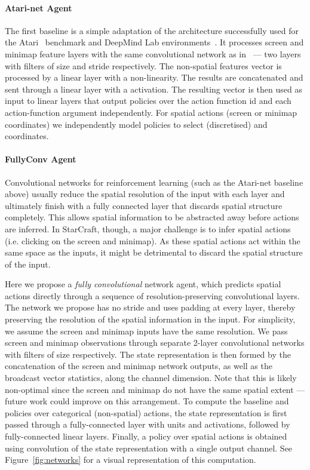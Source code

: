 \documentclass{article}
\begin{document}
\paragraph{Atari-net Agent}
The first baseline is a simple adaptation of the architecture successfully used for the Atari~\cite{bellemare2013arcade} benchmark and DeepMind Lab environments~\cite{Beattie:2016}. 
It processes screen and minimap feature layers with the same convolutional network as in~\cite{mnih2016asynchronous} --- two layers with  filters of size  and stride  respectively. 
The non-spatial features vector is processed by a linear layer with a  non-linearity. 
The results are concatenated and sent through a linear layer with a  activation. 
The resulting vector is then used as input to linear layers that output policies over the action function id  and each action-function argument  independently.
For spatial actions (screen or minimap coordinates) we independently model policies to select (discretised)  and  coordinates.

\paragraph{FullyConv Agent} 
Convolutional networks for reinforcement learning (such as the Atari-net baseline above) usually reduce the spatial resolution of the input with each layer and ultimately finish with a fully connected layer that discards spatial structure completely. 
This allows spatial information to be abstracted away before actions are inferred. In StarCraft, though, a major challenge is to infer spatial actions (i.e. clicking on the screen and minimap). 
As these spatial actions act within the same space as the inputs, it might be detrimental to discard the spatial structure of the input.

Here we propose a \textit{fully convolutional} network agent, which predicts spatial actions directly through a sequence of resolution-preserving convolutional layers.
The network we propose has no stride and uses padding at every layer, thereby preserving the resolution of the spatial information in the input. 
For simplicity, we assume the screen and minimap inputs have the same resolution. 
We pass screen and minimap observations through separate 2-layer convolutional networks with  filters of size  respectively.
The state representation is then formed by the concatenation of the screen and minimap network outputs, as well as the broadcast vector statistics, along the channel dimension.
Note that this is likely non-optimal since the screen and minimap do not have the same spatial extent --- future work could improve on this arrangement.
To compute the baseline and policies over categorical (non-spatial) actions, the state representation is first passed through a fully-connected layer with  units and  activations, followed by fully-connected linear layers.
Finally, a policy over spatial actions is obtained using  convolution of the state representation with a single output channel. See Figure~\ref{fig:networks} for a visual representation of this computation.
\end{document}
